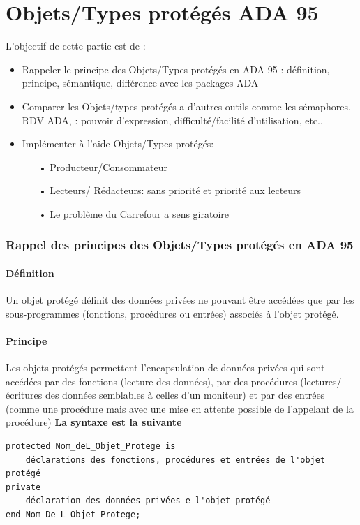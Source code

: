 \documentclass[11pt,a4paper]{article}
\begin{document}
\part{Objets/Types protégés ADA 95}
L'objectif de cette partie est de :
\begin{itemize}
    \item Rappeler le principe des Objets/Types protégés en ADA 95 : définition, principe, sémantique, différence avec les packages ADA
    \item Comparer les  Objets/types protégés a d'autres outils comme  les sémaphores, RDV ADA, : pouvoir d'expression, difficulté/facilité d'utilisation, etc..
    \item  Implémenter à l'aide Objets/Types protégés:
          \begin{itemize}
            \item[•] Producteur/Consommateur
            \item[•] Lecteurs/ Rédacteurs: sans priorité et  priorité aux lecteurs
            \item[•] Le problème du Carrefour a sens giratoire  
          \end{itemize}
\end{itemize}
\section{Rappel des principes des Objets/Types protégés en ADA 95}
\subsection{Définition}
Un objet protégé définit des données privées ne pouvant être accédées que par les sous-programmes (fonctions, procédures ou entrées) associés à l'objet protégé.
\subsection{Principe}
Les objets protégés permettent l'encapsulation de données privées qui sont accédées par des fonctions (lecture des données), par des procédures (lectures/écritures des données semblables à celles d'un moniteur) et par des entrées (comme une procédure mais avec une mise en attente possible de l'appelant de la procédure)
\textbf{La syntaxe est la suivante}
\begin{verbatim}
protected Nom_deL_Objet_Protege is
	déclarations des fonctions, procédures et entrées de l'objet protégé
private
	déclaration des données privées e l'objet protégé
end Nom_De_L_Objet_Protege;
\end{verbatim}
\end{document}
